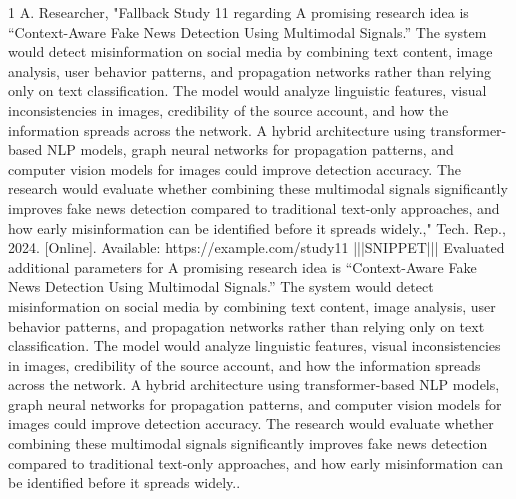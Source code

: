 \documentclass[conference]{IEEEtran}
\begin{document}
\begin{thebibliography}{1}
A. Researcher, "Fallback Study 11 regarding A promising research idea is “Context-Aware Fake News Detection Using Multimodal Signals.” The system would detect misinformation on social media by combining text content, image analysis, user behavior patterns, and propagation networks rather than relying only on text classification. The model would analyze linguistic features, visual inconsistencies in images, credibility of the source account, and how the information spreads across the network. A hybrid architecture using transformer-based NLP models, graph neural networks for propagation patterns, and computer vision models for images could improve detection accuracy. The research would evaluate whether combining these multimodal signals significantly improves fake news detection compared to traditional text-only approaches, and how early misinformation can be identified before it spreads widely.," Tech. Rep., 2024. [Online]. Available: https://example.com/study11 |||SNIPPET||| Evaluated additional parameters for A promising research idea is “Context-Aware Fake News Detection Using Multimodal Signals.” The system would detect misinformation on social media by combining text content, image analysis, user behavior patterns, and propagation networks rather than relying only on text classification. The model would analyze linguistic features, visual inconsistencies in images, credibility of the source account, and how the information spreads across the network. A hybrid architecture using transformer-based NLP models, graph neural networks for propagation patterns, and computer vision models for images could improve detection accuracy. The research would evaluate whether combining these multimodal signals significantly improves fake news detection compared to traditional text-only approaches, and how early misinformation can be identified before it spreads widely..

\end{thebibliography}
\end{document}
